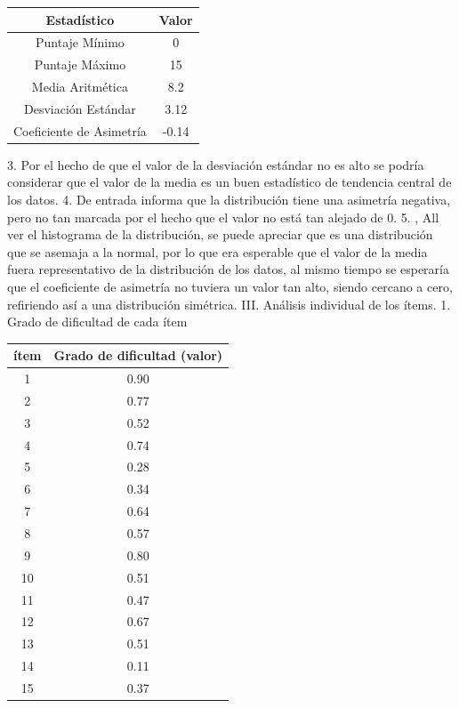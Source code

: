 \documentclass{article}
\begin{document}
\begin{center}
 \begin{tabular}{||c c||} 
 \hline
 Estadístico & Valor \\ [0.5ex] 
 \hline\hline
 Puntaje Mínimo & 0  \\ 
 \hline
 Puntaje Máximo & 15  \\
 \hline
 Media Aritmética & 8.2  \\
 \hline
 Desviación Estándar & 3.12 \\
 \hline
 Coeficiente de Asimetría & -0.14 \\ [1ex] 
 \hline
\end{tabular}
\end{center}
3. Por el hecho de que el valor de la desviación estándar no es alto se podría considerar que el valor de la media es un buen estadístico de tendencia central de los datos. 
4. De entrada informa que la distribución tiene una asimetría negativa, pero no tan marcada por el hecho que el valor no está tan alejado de 0. 
5. , All ver el histograma de la distribución, se puede apreciar que es una distribución que se asemaja a la normal, por lo que era esperable que el valor de la media fuera representativo de la distribución de los datos, al mismo tiempo se esperaría que el coeficiente de asimetría no tuviera un valor tan alto, siendo cercano a cero, refiriendo así a una distribución simétrica. 
III. Análisis individual de los ítems. 
1. Grado de dificultad de cada ítem 
\begin{center}
 \begin{tabular}{||c c||} 
 \hline
 ítem & Grado de dificultad (valor) \\ [0.5ex] 
 \hline\hline
 1 &   0.90 \\ 
 \hline
 2 & 0.77  \\
 \hline
 3 & 0.52  \\
 \hline
 4 & 0.74 \\
 \hline
  5 & 0.28 \\
 \hline
  6 & 0.34 \\
 \hline
  7 & 0.64 \\
 \hline
  8 & 0.57 \\
 \hline
  9 & 0.80 \\
 \hline
  10 & 0.51 \\
 \hline
  11 & 0.47 \\
 \hline
  12 & 0.67 \\
 \hline
  13 & 0.51 \\
 \hline
  14 & 0.11 \\
 \hline
  15 & 0.37 \\
 \hline
\end{tabular}
\end{center}
\end{document}
